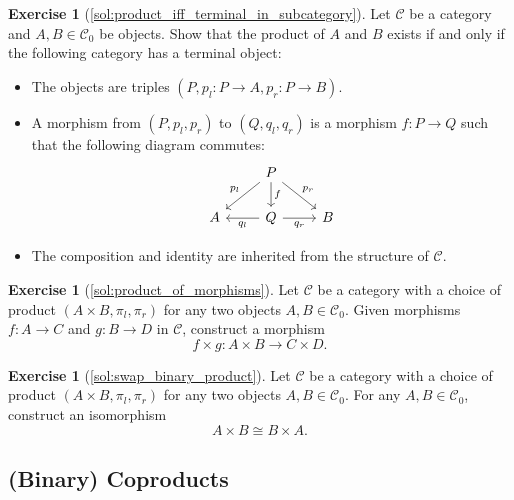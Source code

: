 \documentclass[a4paper,10pt]{scrartcl}
\theoremstyle{plain}
\theoremstyle{definition}
\newtheorem{exer}[thm]{Exercise}
\newcommand{\Cat}[1]{\mathcal{#1}}
\newcommand{\CC}{\Cat{C}}
\newcommand{\Ob}[1]{{#1}_0}
\newcommand{\projl}{\ensuremath{\pi_l}}
\newcommand{\projr}{\ensuremath{\pi_r}}
\begin{document}
\begin{exer}[\cref{sol:product_iff_terminal_in_subcategory}]\label{exer:product_iff_terminal_in_subcategory} Let $\CC$ be a category and $A,B\in\Ob{\CC}$ be objects. Show that the product of $A$ and $B$ exists if and only if the following category has a terminal object:
\begin{itemize}
\item The objects are triples $(P,p_l: P\to A, p_r:P\to B)$.
\item A morphism from $(P,p_l,p_r)$ to $(Q,q_l,q_r)$ is a morphism $f : P \to Q$ such that the following diagram commutes:
\[
\begin{tikzcd}
& P \arrow[ld,swap, "p_l"] \arrow[rd, "p_r"] \arrow[d, "f"] & \\
A & Q \arrow[l, "q_l"]  \arrow[r,swap, "q_r"] & B
\end{tikzcd}
\]
\item The composition and identity are inherited from the structure of $\CC$.
\end{itemize}
\end{exer}

\begin{exer}[\cref{sol:product_of_morphisms}]\label{exer:product_of_morphisms}
  Let $\CC$ be a category with a choice of product $(A\times B, \projl, \projr)$ for any two objects $A,B\in \Ob{\CC}$.
  Given morphisms $f : A \to C$ and $g : B \to D$ in $\CC$, construct a morphism
  \[ f \times g : A \times B \to C \times D.\]
\end{exer}


\begin{exer}[\cref{sol:swap_binary_product}]\label{exer:swap_binary_product}
  Let $\CC$ be a category with a choice of product $(A\times B, \projl, \projr)$ for any two objects $A,B\in \Ob{\CC}$.
  For any $A, B \in \Ob\CC$, construct an isomorphism
  \[ A \times B \cong B \times A. \]
\end{exer}


\subsection{(Binary) Coproducts}
\label{sec:coproducts}
\end{document}
